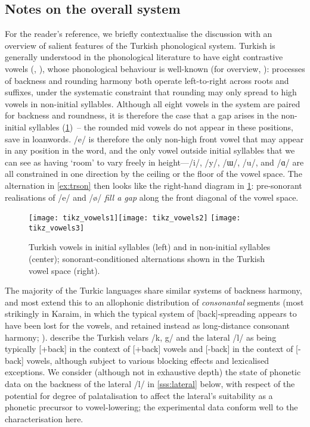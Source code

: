 \subsection{Notes on the overall system}\label{sss:trphonology}
For the reader's reference, we briefly contextualise the discussion with an overview of salient features of the Turkish phonological system. Turkish is generally understood in the phonological literature to have eight contrastive vowels (\citealt{Hulst1991}, \citealt{Kabak2011}), whose phonological behaviour is well-known (for overview, \citealt{Clements1982,Kabak2011}): processes of backness and rounding harmony both operate left-to-right across roots and suffixes, under the systematic constraint that rounding may only spread to high vowels in non-initial syllables. Although all eight vowels in the system are paired for backness and roundness, it is therefore the case that a gap arises in the non-initial syllables (\cref{fig:trvowelsall}) – the rounded mid vowels do not appear in these positions, save in loanwords. /e/ is therefore the only non-high front vowel that may appear in any position in the word, and the only vowel outside initial syllables that we can see as having `room' to vary freely in height---/i/, /y/, /ɯ/, /u/, and /ɑ/ are all constrained in one direction by the ceiling or the floor of the vowel space. The alternation in \cref{ex:trson} then looks like the right-hand diagram in  \cref{fig:trvowelsall}: pre-sonorant realisations of /e/ and /ø/ \emph{fill a gap} along the front diagonal of the vowel space. \\

\begin{figure}[H]
  \centering
 \texttt{[image: tikz\_vowels1]}\hfill  \texttt{[image: tikz\_vowels2]} \hfill  \texttt{[image: tikz\_vowels3]}
\caption{Turkish vowels in initial syllables (left) and in non-initial syllables (center); sonorant-conditioned alternations shown in the Turkish vowel space (right).}
\label{fig:trvowelsall}
\end{figure}

The majority of the Turkic languages share similar systems of backness harmony, and most extend this to an allophonic distribution of \emph{consonantal} segments (most strikingly in Karaim, in which the typical system of [back]-spreading appears to have been lost for the vowels, and retained instead as long-distance consonant harmony; \citealt{Nevins2003}). \cite{Clements1982} describe the Turkish velars /k, g/ and the lateral /l/ as being typically [+back] in the context of [+back] vowels and [-back] in the context of [-back] vowels, although subject to various blocking effects and lexicalised exceptions. We consider (although not in exhaustive depth) the state of phonetic data on the backness of the lateral /l/ in \cref{sss:lateral} below, with respect of the potential for degree of palatalisation to affect the lateral's suitability as a phonetic precursor to vowel-lowering; the experimental data conform well to the characterisation here.

